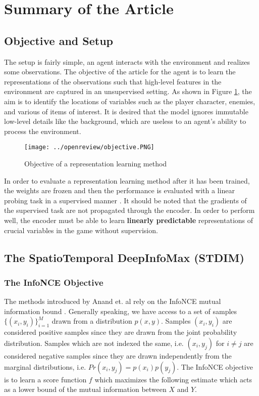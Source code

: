 \section{Summary of the Article}
\label{section:summary}

\subsection{Objective and Setup}
The setup is fairly simple, an agent interacts with the environment and realizes some observations. The objective of the article for the agent is to learn the representations of the observations such that high-level features in the environment are captured in an unsupervised setting. As shown in Figure \ref{fig:objective}, the aim is to identify the locations of variables such as the player character, enemies, and various of items of interest. It is desired that the model ignores immutable low-level details like the background, which are useless to an agent's ability to process the environment.

\begin{figure}[H]
    \centering
    \texttt{[image: ../openreview/objective.PNG]}
    \caption{Objective of a representation learning method}
    \label{fig:objective}
\end{figure}

In order to evaluate a representation learning method after it has been trained, the weights are frozen and then the performance is evaluated with a linear probing task in a supervised manner \cite{linear_probing}. It should be noted that the gradients of the supervised task are not propagated through the encoder. In order to perform well, the encoder must be able to learn \textbf{linearly predictable} representations of crucial variables in the game without supervision.

\subsection{The SpatioTemporal DeepInfoMax (STDIM)}
\label{section:stdim}

\subsubsection{The InfoNCE Objective}

The methods introduced by Anand et. al \cite{main_article} rely on the InfoNCE mutual information bound \cite{infoNCE}. Generally speaking, we have access to a set of samples $\{(x_i, y_i)\}_{i=1}^{M}$ drawn from a distribution $p(x, y)$. Samples $(x_i, y_i)$ are considered positive samples since they are drawn from the joint probability distribution. Samples which are not indexed the same, i.e. $(x_i, y_j)$ for $i\neq j$ are considered negative samples since they are drawn independently from the marginal distributions, i.e. $Pr(x_i, y_j)=p(x_i)p(y_j)$. The InfoNCE objective is to learn a score function $f$ which maximizes the following estimate which acts as a lower bound of the mutual information between $X$ and $Y$.

